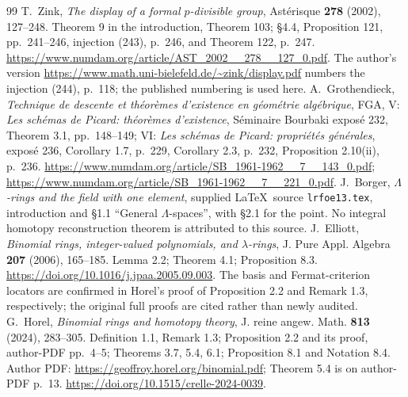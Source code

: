 \documentclass[11pt,a4paper]{article}
\theoremstyle{definition}\newtheorem{remark}[theorem]{Remark}
\begin{document}
\begin{thebibliography}{99}
 T.~Zink, \emph{The display of a formal $p$-divisible group}, Ast\'erisque \textbf{278} (2002), 127--248. Theorem 9 in the introduction, Theorem 103; \S4.4, Proposition 121, pp.~241--246, injection (243), p.~246, and Theorem 122, p.~247. \url{https://www.numdam.org/article/AST_2002__278__127_0.pdf}. The author's version \url{https://www.math.uni-bielefeld.de/~zink/display.pdf} numbers the injection (244), p.~118; the published numbering is used here.
 A.~Grothendieck, \emph{Technique de descente et th\'eor\`emes d'existence en g\'eom\'etrie alg\'ebrique}, FGA, V: \emph{Les sch\'emas de Picard: th\'eor\`emes d'existence}, S\'eminaire Bourbaki expos\'e 232, Theorem 3.1, pp.~148--149; VI: \emph{Les sch\'emas de Picard: propri\'et\'es g\'en\'erales}, expos\'e 236, Corollary 1.7, p.~229, Corollary 2.3, p.~232, Proposition 2.10(ii), p.~236. \url{https://www.numdam.org/article/SB_1961-1962__7__143_0.pdf}; \url{https://www.numdam.org/article/SB_1961-1962__7__221_0.pdf}.
 J.~Borger, \emph{$\Lambda$-rings and the field with one element}, supplied \LaTeX\ source \texttt{lrfoe13.tex}, introduction and \S1.1 ``General $\Lambda$-spaces'', with \S2.1 for the point. No integral homotopy reconstruction theorem is attributed to this source.
 J.~Elliott, \emph{Binomial rings, integer-valued polynomials, and $\lambda$-rings}, J. Pure Appl. Algebra \textbf{207} (2006), 165--185. Lemma 2.2; Theorem 4.1; Proposition 8.3. \url{https://doi.org/10.1016/j.jpaa.2005.09.003}. The basis and Fermat-criterion locators are confirmed in Horel's proof of Proposition 2.2 and Remark 1.3, respectively; the original full proofs are cited rather than newly audited.
 G.~Horel, \emph{Binomial rings and homotopy theory}, J. reine angew. Math. \textbf{813} (2024), 283--305. Definition 1.1, Remark 1.3; Proposition 2.2 and its proof, author-PDF pp.~4--5; Theorems 3.7, 5.4, 6.1; Proposition 8.1 and Notation 8.4. Author PDF: \url{https://geoffroy.horel.org/binomial.pdf}; Theorem 5.4 is on author-PDF p.~13. \url{https://doi.org/10.1515/crelle-2024-0039}.
\end{thebibliography}
\end{document}
